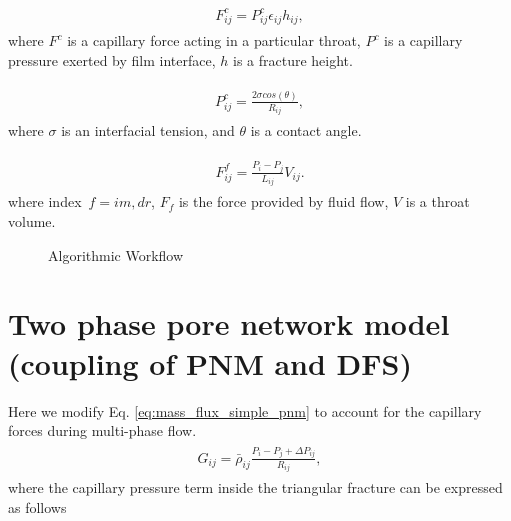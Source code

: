 \documentclass[a4paper,12pt]{extreport}
\begin{document}
\begin{eqnarray}
\label{capill}
\begin{gathered}
F_{ij}^{c} = P_{ij}^c \epsilon_{ij}h_{ij},
\end{gathered}
\end{eqnarray}
where $F^{c}$ is a capillary force acting in a particular throat, $P^{c}$ is a capillary pressure exerted by film interface, $h$ is a fracture height.

\begin{eqnarray}
\label{capill}
\begin{gathered}
P_{ij}^{c} = \frac{2\sigma cos(\theta)}{R_{ij}},
\end{gathered}
\end{eqnarray}
where $\sigma$ is an interfacial tension, and $\theta$ is a contact angle.

\begin{eqnarray}
\label{drainage}
\begin{gathered}
F_{ij}^{f} = \frac{P_i - P_j}{L_{ij}} V_{ij}.
\end{gathered}
\end{eqnarray}
where index~$f=im, dr$, $F_f$ is the force provided by fluid flow, $V$ is a throat volume.

%	
\newpage
\begin{figure}[ht!]
	
	\vspace{2 cm}
	\centering
	
	
	\caption{Algorithmic Workflow}
	\label{fig:workflow}
\end{figure}

\newpage
 \section*{Two phase pore network model (coupling of  PNM and DFS)}
 
 Here we modify Eq. \ref{eq:mass_flux_simple_pnm} to account for the capillary forces during multi-phase flow. 
 \begin{eqnarray}
 \begin{gathered}
 \label{eq:mass_flux_simple_pnm}
 G_{ij} = \bar{\rho}_{ij} \frac{P_{i} - P_{j} + \Delta P_{ij}}{R_{ij}},
 \end{gathered}
 \end{eqnarray}
  where the capillary pressure term inside the triangular fracture can be expressed as follows
  
\end{document}

